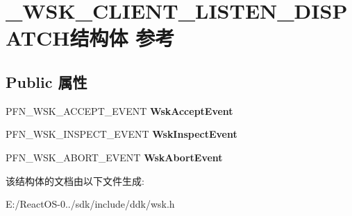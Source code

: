 \hypertarget{struct___w_s_k___c_l_i_e_n_t___l_i_s_t_e_n___d_i_s_p_a_t_c_h}{}\section{\+\_\+\+W\+S\+K\+\_\+\+C\+L\+I\+E\+N\+T\+\_\+\+L\+I\+S\+T\+E\+N\+\_\+\+D\+I\+S\+P\+A\+T\+C\+H结构体 参考}
\label{struct___w_s_k___c_l_i_e_n_t___l_i_s_t_e_n___d_i_s_p_a_t_c_h}
\subsection*{Public 属性}
\begin{DoxyCompactItemize}
\item 
\mbox{\label{struct___w_s_k___c_l_i_e_n_t___l_i_s_t_e_n___d_i_s_p_a_t_c_h_a57c30e52a03ad6363d8972a968694512}} 
P\+F\+N\+\_\+\+W\+S\+K\+\_\+\+A\+C\+C\+E\+P\+T\+\_\+\+E\+V\+E\+NT {\bfseries Wsk\+Accept\+Event}
\item 
\mbox{\label{struct___w_s_k___c_l_i_e_n_t___l_i_s_t_e_n___d_i_s_p_a_t_c_h_a1edf89ea39ab15077afe7d1b4f082bc7}} 
P\+F\+N\+\_\+\+W\+S\+K\+\_\+\+I\+N\+S\+P\+E\+C\+T\+\_\+\+E\+V\+E\+NT {\bfseries Wsk\+Inspect\+Event}
\item 
\mbox{\label{struct___w_s_k___c_l_i_e_n_t___l_i_s_t_e_n___d_i_s_p_a_t_c_h_af787180da517350f51c3159bca90a4e7}} 
P\+F\+N\+\_\+\+W\+S\+K\+\_\+\+A\+B\+O\+R\+T\+\_\+\+E\+V\+E\+NT {\bfseries Wsk\+Abort\+Event}
\end{DoxyCompactItemize}


该结构体的文档由以下文件生成\+:\begin{DoxyCompactItemize}
\item 
E\+:/\+React\+O\+S-\/0../sdk/include/ddk/wsk.\+h\end{DoxyCompactItemize}
